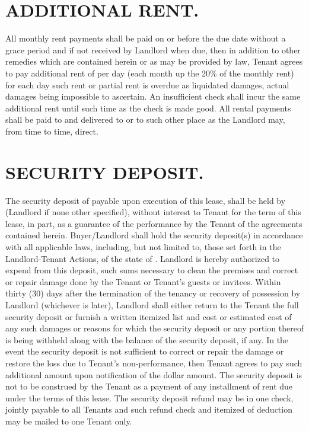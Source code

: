\documentclass[9pt]{article}
\renewcommand{\LandlordName}{asas}
\renewcommand{\LandlordAddress}{sasa}
\renewcommand{\LateFee}{25}
\renewcommand{\SecurityDeposit}{1000}
\renewcommand{\State}{sas}
\begin{document}
	\section{ADDITIONAL RENT.}
	All monthly rent payments shall be paid on or before the due date without a grace period and if not received by Landlord when due, then in addition to other remedies which are contained herein or as may be provided by law, Tenant agrees to pay additional rent of \DateBox{\$\LateFee} per day (each month up the 20\% of the monthly rent) for each day such rent or partial rent is overdue as liquidated damages, actual damages being impossible to ascertain. An insufficient check shall incur the same additional rent until such time as the check is made good. All rental payments shall be paid to \MidBox{\LandlordName} and delivered to \BigBox{\LandlordAddress} or to such other place as the Landlord may, from time to time, direct.
	
	\section{SECURITY DEPOSIT.}
	The security deposit of \DateBox{\$\SecurityDeposit} payable upon execution of this lease, shall be held by \GoodBox{\LandlordName} (Landlord if none other specified), without interest to Tenant for the term of this lease, in part, as a guarantee of the performance by the Tenant of the agreements contained herein. Buyer/Landlord shall hold the security deposit(s) in accordance with all applicable laws, including, but not limited to, those set forth in the Landlord-Tenant Actions, of the state of \SmallBox{\State}. Landlord is hereby authorized to expend from this deposit, such sums necessary to clean the premises and correct or repair damage done by the Tenant or Tenant's guests or invitees. Within thirty (30) days after the termination of the tenancy or recovery of possession by Landlord (whichever is later), Landlord shall either return to the Tenant the full security deposit or furnish a written itemized list and cost or estimated cost of any such damages or reasons for which the security deposit or any portion thereof is being withheld along with the balance of the security deposit, if any. In the event the security deposit is not sufficient to correct or repair the damage or restore the loss due to Tenant's non-performance, then Tenant agrees to pay such additional amount upon notification of the dollar amount. The security deposit is not to be construed by the Tenant as a payment of any installment of rent due under the terms of this lease. The security deposit refund may be in one check, jointly payable to all Tenants and such refund check and itemized of deduction may be mailed to one Tenant only.\\
	
\end{document}
